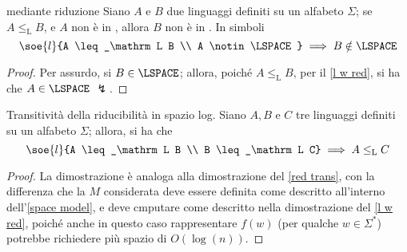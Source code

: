 \documentclass[a4paper, 12pt]{report}
\begin{document}
    \begin{framedcor}{\LSPACE mediante riduzione}
        Siano $A$ e $B$ due linguaggi definiti su un alfabeto $\Sigma$; se $A \leq_\mathrm L B$, e $A$ non è in \LSPACE, allora $B$ non è in \LSPACE. In simboli $$\soe{l}{A \leq_\mathrm L B \\ A \notin \LSPACE} \implies B \notin \LSPACE$$
    \end{framedcor}

    \begin{proof}
        Per assurdo, si $B \in \LSPACE$; allora, poiché $A \leq_\mathrm L B$, per il \cref{l w red}, si ha che $A \in \LSPACE$ $\lightning$.
    \end{proof}

    \begin{framedlem}[label={l red trans}]{Transitività della riducibilità in spazio log.}
        Siano $A, B$ e $C$ tre linguaggi definiti su un alfabeto $\Sigma$; allora, si ha che $$\soe{l}{A \leq_\mathrm L B \\ B \leq_\mathrm L C} \implies A \leq_\mathrm L C$$
    \end{framedlem}

    \begin{proof}
        La dimostrazione è analoga alla dimostrazione del \cref{red trans}, con la differenza che la \TM $M$ considerata deve essere definita come descritto all'interno dell'\cref{space model}, e deve cmputare come descritto nella dimostrazione del \cref{l w red}, poiché anche in questo caso rappresentare $f(w)$ (per qualche $w \in \Sigma^*$) potrebbe richiedere più spazio di $O(\log(n))$.
    \end{proof}
\end{document}
